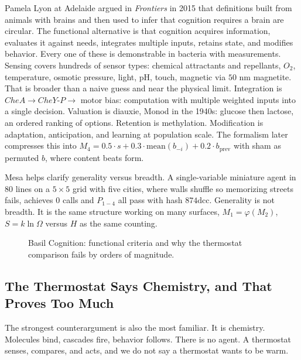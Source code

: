 \documentclass[11pt,a4paper]{article}
\begin{document}
Pamela Lyon at Adelaide argued in \textit{Frontiers} in 2015 that definitions built from animals with brains and then used to infer that cognition requires a brain are circular. The functional alternative is that cognition acquires information, evaluates it against needs, integrates multiple inputs, retains state, and modifies behavior. Every one of these is demonstrable in bacteria with measurements. Sensing covers hundreds of sensor types: chemical attractants and repellants, $O_2$, temperature, osmotic pressure, light, pH, touch, magnetic via $50$ nm magnetite. That is broader than a naive guess and near the physical limit. Integration is $CheA \to CheY\text{-}P \to$ motor bias: computation with multiple weighted inputs into a single decision. Valuation is diauxie, Monod in the 1940s: glucose then lactose, an ordered ranking of options. Retention is methylation. Modification is adaptation, anticipation, and learning at population scale. The formalism later compresses this into $M_4 = 0.5 \cdot s + 0.3 \cdot \text{mean}(b_{-i}) + 0.2 \cdot b_{\text{prev}}$ with sham as permuted $b$, where content beats form.

Mesa helps clarify generality versus breadth. A single-variable miniature agent in $80$ lines on a $5 \times 5$ grid with five cities, where walls shuffle so memorizing streets fails, achieves $0$ calls and $P_{1-4}$ all pass with hash $874\text{dcc}$. Generality is not breadth. It is the same structure working on many surfaces, $M_1 = \varphi(M_2)$, $S = k \ln \Omega$ versus $H$ as the same counting.

\begin{figure}[h]
\centering
{}
\caption{Basil Cognition: functional criteria and why the thermostat comparison fails by orders of magnitude.}
\label{fig:lyon}
\end{figure}

\subsection{The Thermostat Says Chemistry, and That Proves Too Much}

The strongest counterargument is also the most familiar. It is chemistry. Molecules bind, cascades fire, behavior follows. There is no agent. A thermostat senses, compares, and acts, and we do not say a thermostat wants to be warm.
\end{document}
